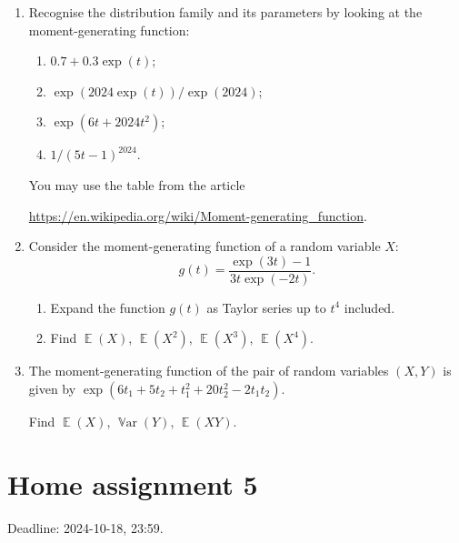 \documentclass[12pt]{article}
\DeclareMathOperator{\Var}{\mathbb{V}ar}
\DeclareMathOperator{\E}{\mathbb{E}}
\begin{document}
\begin{enumerate}
    \item Recognise the distribution family and its parameters by looking at the moment-generating function:
    
    \begin{enumerate}
        \item $0.7 + 0.3\exp(t)$;
        \item $\exp(2024\exp(t)) / \exp(2024)$;
        \item $\exp(6t + 2024t^2)$;
        \item $1/(5t - 1)^{2024}$.
    \end{enumerate}
    
    You may use the table from the article 
    
    \url{https://en.wikipedia.org/wiki/Moment-generating_function}.
    
    \item Consider the moment-generating function of a random variable $X$:
    \[
     g(t) = \frac{\exp(3t) - 1}{3t\exp(-2t)}.
    \]
    
    \begin{enumerate}
        \item Expand the function $g(t)$ as Taylor series up to $t^4$ included. 
        \item Find $\E(X)$, $\E(X^2)$, $\E(X^3)$, $\E(X^4)$.
    \end{enumerate}


    \item The moment-generating function of the pair of random variables $(X, Y)$ is given by 
    $\exp(6t_1 + 5t_2 + t_1^2 + 20t_2^2 - 2t_1t_2)$.

    Find $\E(X)$, $\Var(Y)$, $\E(XY)$.
    
\end{enumerate}



\section*{Home assignment 5}

Deadline: 2024-10-18, 23:59.
\end{document}

